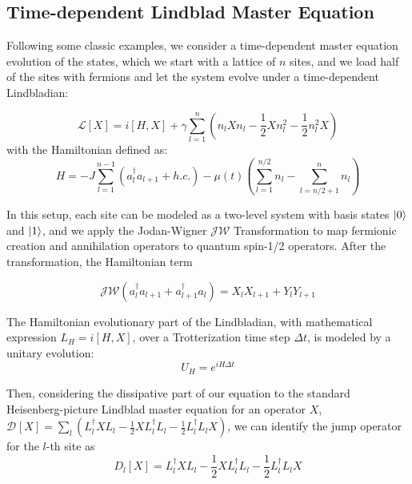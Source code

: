 \documentclass[%
 reprint,
superscriptaddress,
 amsmath,amssymb,
 aps,
]{revtex4-2}
\begin{document}
\subsection{Time-dependent Lindblad Master Equation}

Following some classic examples, we consider a time-dependent master equation evolution of the states, which we start with a lattice of $n$ sites, and we load half of the sites with fermions and let the system evolve under a time-dependent Lindbladian:


\begin{equation}
    \mathcal{L}[X]=i[H, X]+\gamma \sum_{l=1}^n\left(n_l X n_l-\frac{1}{2} X n_l^2-\frac{1}{2} n_l^2 X\right)
    \label{eq:TDME_Lindbladian}
\end{equation}
with the Hamiltonian defined as:
\begin{equation}
H = -J \sum_{l=1}^{n-1} \left( a_l^{\dagger} a_{l+1} + h.c. \right) - \mu(t) \left( \sum_{l=1}^{n/2} n_l - \sum_{l=n/2+1}^{n} n_l \right)
\end{equation}

In this setup, each site can be modeled as a two-level system with basis states $\ket{0}$ and $\ket{1}$, and we apply the Jodan-Wigner $\mathcal{JW}$ Transformation to map fermionic creation and annihilation operators to quantum spin-1/2 operators. After the transformation, the Hamiltonian term

\begin{equation}
    \mathcal{JW}(a_l^{\dagger} a_{l+1} + a_{l+1}^{\dagger} a_{l})=X_lX_{l+1}+Y_lY_{l+1}
\end{equation}

The Hamiltonian evolutionary part of the Lindbladian, with mathematical expression $L_H= i[H, X]$, over a Trotterization time step $\Delta t$, is modeled by a unitary evolution:
\begin{equation}
    U_H = e^{iH\Delta t}
\end{equation}

Then, considering the dissipative part of our equation to the standard Heisenberg-picture Lindblad master equation for an operator $X$, $\mathcal{D}_{\text{}}[X] = \sum_l \left( L_l^\dagger X L_l - \frac{1}{2} X L_l^\dagger L_l - \frac{1}{2} L_l^\dagger L_l X \right)$, we can identify the jump operator for the $l$-th site as 
\begin{equation}
    D_l[X]= L_l^\dagger X L_l - \frac{1}{2} X L_l^\dagger L_l - \frac{1}{2} L_l^\dagger L_l X 
\end{equation}
\end{document}
